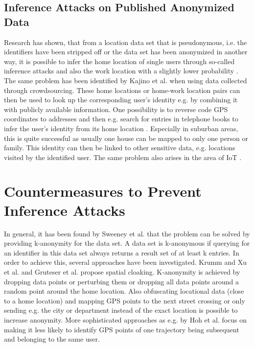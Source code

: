 \subsection{Inference Attacks on Published Anonymized Data}
Research has shown, that from a location data set that is pseudonymous, i.e. the identifiers have been stripped off or the data set has been anonymized in another way, it is possible to infer the home location of single users through so-called inference attacks \parencite{krumm, cellphone, privacy-home-work-pairs, hoh2006enhancing, twitter} and also the work location with a slightly lower probability \parencite{cellphone, privacy-home-work-pairs}. The same problem has been identified by Kajino et al. \parencite{crowdsourcing} when using data collected through crowdsourcing.
These home locations or home-work location pairs can then be used to look up the corresponding user's identity e.g. by combining it with publicly available information. One possibility is to reverse code GPS coordinates to addresses and then e.g. search for entries in telephone books to infer the user's identity from its home location \parencite{krumm, privacy-home-work-pairs, hoh2006enhancing}. Especially in suburban areas, this is quite successful as usually one house can be mapped to only one person or family. This identity can then be linked to other sensitive data, e.g. locations visited by the identified user. The same problem also arises in the area of IoT \parencite{iot, hoh2006enhancing}.

\section{Countermeasures to Prevent Inference Attacks}
In general, it has been found by Sweeney et al. \parencite{k-anonymity} that the problem can be solved by providing k-anonymity for the data set. A data set is k-anonymous if querying for an identifier in this data set always returns a result set of at least k entries.
In order to achieve this, several approaches have been investigated. Krumm \parencite{krumm} and Xu et al. \parencite{xu2018location} and Gruteser et al. \parencite{gruteser2003anonymous} propose spatial cloaking. K-anonymity is achieved by dropping data points or perturbing them or dropping all data points around a random point around the home location. Also obfuscating locational data (close to a home location) and mapping GPS points to the next street crossing or only sending e.g. the city or department instead of the exact location is possible to increase anonymity.
More sophisticated approaches as e.g. by Hoh et al. \parencite{time-to-confusion} focus on making it less likely to identify GPS points of one trajectory being subsequent and belonging to the same user.

